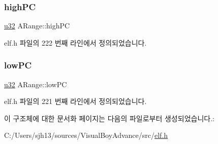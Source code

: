 \subsubsection{\texorpdfstring{high\+PC}{highPC}}
{\footnotesize\ttfamily \mbox{\hyperlink{_system_8h_a10e94b422ef0c20dcdec20d31a1f5049}{u32}} A\+Range\+::high\+PC}



elf.\+h 파일의 222 번째 라인에서 정의되었습니다.

\mbox{\label{struct_a_range_a967436344fa630513a70d3fadb4c3bbe}} 
\subsubsection{\texorpdfstring{low\+PC}{lowPC}}
{\footnotesize\ttfamily \mbox{\hyperlink{_system_8h_a10e94b422ef0c20dcdec20d31a1f5049}{u32}} A\+Range\+::low\+PC}



elf.\+h 파일의 221 번째 라인에서 정의되었습니다.



이 구조체에 대한 문서화 페이지는 다음의 파일로부터 생성되었습니다.\+:\begin{DoxyCompactItemize}
\item 
C\+:/\+Users/sjh13/sources/\+Visual\+Boy\+Advance/src/\mbox{\hyperlink{elf_8h}{elf.\+h}}\end{DoxyCompactItemize}

